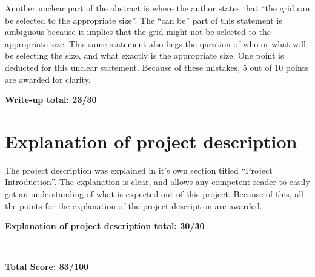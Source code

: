 Another unclear part of the abstract is where the author states
that ``the grid can be selected to the appropriate size''.  The ``can be'' part of this statement
is ambiguous because it implies that the grid might not be selected to the appropriate size.
This same statement also begs the question of who or what will be selecting the size, and what
exactly is the appropriate size.  One point is deducted for this unclear statement.  Because of
these mistakes, 5 out of 10 points are awarded for clarity.

\hspace{20pt}

{\bf Write-up total:  23/30}

\section{Explanation of project description}
The project description was explained in it's own section titled ``Project Introduction''.  The explanation
is clear, and allows any competent reader to easily get an understanding of what is expected out of this
project.  Because of this, all the points for the explanation of the project description are awarded.

\vspace{20pt}

{\bf Explanation of project description total: 30/30}

~\vfill

{\bf {\LARGE Total Score: 83/100}}

~\vfill
